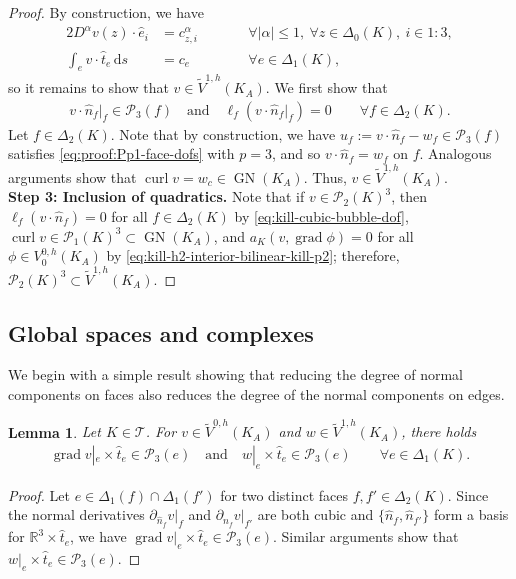 \documentclass{mcom-l}
\newtheorem{lemma}[theorem]{Lemma}
\theoremstyle{definition}
\theoremstyle{remark}
\numberwithin{equation}{section}
\newcommand{\unitvec}[1]{\hat{#1}}
\renewcommand{\d}[1]{\,\mathrm{d}{#1}}
\DeclareMathOperator{\GN}{GN}
\DeclareMathOperator{\curl}{curl}
\DeclareMathOperator{\grad}{grad}
\newcommand{\mesh}[0]{\mathcal{T}}
\begin{document}
\begin{proof}
	By construction, we have
	\begin{alignat*}{2}
		D^{\alpha} v(z) \cdot \unitvec{e}_i &= c_{z, i}^{\alpha} 
		\qquad & & \forall|\alpha| \leq 1, \ \forall z \in \Delta_0(K), 
		\ i \in 1:3, \\
		\int_{e} v \cdot \unitvec{t}_e \d{s} &= c_e
		\qquad & & \forall e \in \Delta_1(K),
	\end{alignat*}
	so it remains to show that 
	$v \in \tilde{V}^{1, h}(K_A)$. We first show that 
	\begin{align*}
		v \cdot \unitvec{n}_f|_{f} \in \mathcal{P}_3(f) 
		\quad \text{and} \quad \ell_f(v \cdot \unitvec{n}_f|_{f}) = 0
		\qquad \forall f \in \Delta_2(K).
	\end{align*}
	Let $f \in \Delta_2(K)$. Note that by construction, we have 
	$u_f := v \cdot \unitvec{n}_f - w_f \in \mathcal{P}_{3}(f)$
	satisfies \cref{eq:proof:Pp1-face-dofs} with $p=3$, and so 
	$v \cdot \unitvec{n}_f = w_f$ on $f$.	 
	Analogous arguments show that $\curl v = w_c \in \GN(K_A)$. 
	Thus, $v \in \tilde{V}^{1, h}(K_A)$. \\	  
	
	\noindent \textbf{Step 3: Inclusion of quadratics. }
	Note that if $v \in \mathcal{P}_2(K)^3$, then
	$\ell_f(v \cdot \unitvec{n}_f) = 0$ for all $f \in \Delta_2(K)$
	by \cref{eq:kill-cubic-bubble-dof}, 
	$\curl v \in \mathcal{P}_1(K)^3 \subset \GN(K_A)$,
	and $a_K(v, \grad \phi) = 0$ for all $\phi \in V^{0, h}_0(K_A)$
	by \cref{eq:kill-h2-interior-bilinear-kill-p2}; therefore,
	$\mathcal{P}_2(K)^3 \subset \tilde{V}^{1, h}(K_A)$.
\end{proof}

\subsection{Global spaces and complexes}

We begin with a simple result showing that reducing the degree of 
normal components on faces also reduces the degree of the normal components 
on edges.
\begin{lemma}
	\label{lem:h2h1curl-edge-normal-degree-reduction}
	Let $K \in \mesh$. For $v \in \tilde{V}^{0, h}(K_A)$ and 
	$w \in \tilde{V}^{1, h}(K_A)$, there holds 
	\begin{align}
		\grad v|_e \times \unitvec{t}_e \in \mathcal{P}_3(e)
		\quad \text{and} \quad 
		w|_e \times \unitvec{t}_e \in \mathcal{P}_3(e) 
		\qquad \forall e \in \Delta_1(K).
	\end{align}
\end{lemma}
\begin{proof}
	Let $e \in \Delta_1(f) \cap \Delta_1(f')$ for 
	two distinct faces $f, f' \in \Delta_2(K)$.
	Since the normal derivatives 
	$\partial_{\unitvec{n}_f} v|_f$ and 
	$\partial_{\unitvec{n}_f} v|_{f'}$ are both cubic
	and $\{ \unitvec{n}_f, \unitvec{n}_{f'} \}$ form a basis for 
	$\mathbb{R}^3 \times \unitvec{t}_e$, we have
	$\grad v|_e \times \unitvec{t}_e \in \mathcal{P}_3(e)$.
	Similar arguments show that 
	$w|_e \times \unitvec{t}_e \in \mathcal{P}_3(e)$.
\end{proof}
\end{document}
